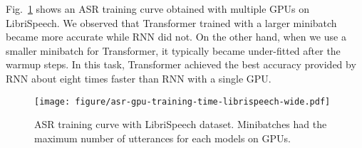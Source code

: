 Fig.~\ref{fig:asr_training} shows an ASR training curve obtained with multiple GPUs on LibriSpeech.
We observed that Transformer trained with a larger minibatch became more accurate while RNN did not.
On the other hand, when we use a smaller minibatch for Transformer, it typically became under-fitted after the warmup steps.
In this task, Transformer achieved the best accuracy provided by RNN about eight times faster than RNN with a single GPU.

\begin{figure}
    \centering
    \texttt{[image: figure/asr-gpu-training-time-librispeech-wide.pdf]}
    \vspace{-10mm}
\caption{ASR training curve with LibriSpeech dataset. Minibatches had the maximum number of utterances for each models on GPUs.}
    \vspace{-5mm}
    \label{fig:asr_training}
\end{figure}

